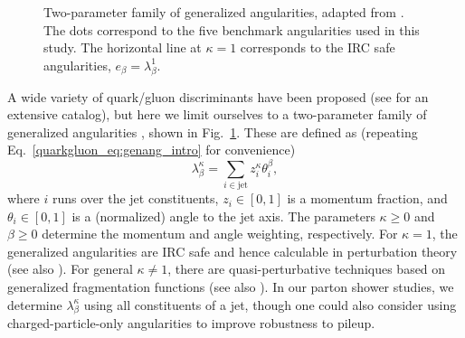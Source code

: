 \documentclass[11pt]{cernrep}
\begin{document}
\begin{figure}
\centering
{}
\caption{Two-parameter family of generalized angularities, adapted from \cite{Larkoski:2014pca}.  The dots correspond to the five benchmark angularities used in this study.  The horizontal line at $\kappa = 1$ corresponds to the IRC safe angularities, $e_\beta = \lambda^{1}_{\beta}$.}
\label{quarkgluon_fig:lambda_space}
\end{figure}

A wide variety of quark/gluon discriminants have been proposed (see \cite{Gallicchio:2012ez} for an extensive catalog), but here we limit ourselves to a two-parameter family of generalized angularities \cite{Larkoski:2014pca}, shown in Fig.~\ref{quarkgluon_fig:lambda_space}.  These are defined as (repeating Eq.~\eqref{quarkgluon_eq:genang_intro} for convenience)
\begin{equation}
\label{quarkgluon_eq:genang}
\lambda^{\kappa}_{\beta} = \sum_{i \in \text{jet}} z_i^\kappa \theta_i^\beta,
\end{equation}
where $i$ runs over the jet constituents, $z_i \in [0,1]$ is a momentum fraction, and $\theta_i \in [0,1]$ is a (normalized) angle to the jet axis.  The parameters $\kappa \ge 0$ and $\beta \ge 0$ determine the momentum and angle weighting, respectively.  For $\kappa = 1$, the generalized angularities are IRC safe and hence calculable in perturbation theory \cite{Larkoski:2014uqa} (see also \cite{Ellis:2010rwa,Larkoski:2013paa,Larkoski:2014tva,Procura:2014cba,Hornig:2016ahz}).  For general $\kappa \not= 1$, there are quasi-perturbative techniques based on generalized fragmentation functions \cite{Larkoski:2014pca} (see also \cite{Krohn:2012fg,Waalewijn:2012sv,Chang:2013rca,Chang:2013iba}).  In our parton shower studies, we determine $\lambda^{\kappa}_{\beta}$ using all constituents of a jet, though one could also consider using charged-particle-only angularities to improve robustness to pileup.
\end{document}
